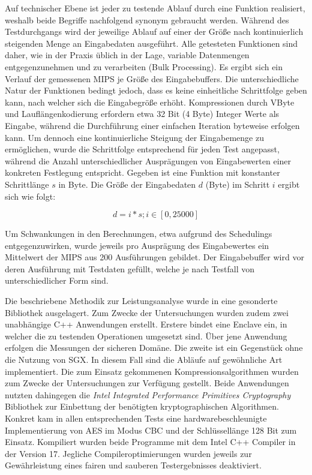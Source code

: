 Auf technischer Ebene ist jeder zu testende Ablauf durch eine Funktion realisiert, weshalb beide Begriffe nachfolgend synonym gebraucht werden. Während des Testdurchgangs wird der jeweilige Ablauf auf einer der Größe nach kontinuierlich steigenden Menge an Eingabedaten ausgeführt. Alle getesteten Funktionen sind daher, wie in der Praxis üblich in der Lage, variable Datenmengen entgegenzunehmen und zu verarbeiten (Bulk Processing). Es ergibt sich ein Verlauf der gemessenen \ac{MIPS} je Größe des Eingabebuffers. Die unterschiedliche Natur der Funktionen bedingt jedoch, dass es keine einheitliche Schrittfolge geben kann, nach welcher sich die Eingabegröße erhöht. Kompressionen durch VByte und Lauflängenkodierung erfordern etwa 32 Bit (4 Byte) Integer Werte als Eingabe, während die Durchführung einer einfachen Iteration byteweise erfolgen kann. Um dennoch eine kontinuierliche Steigung der Eingabemenge zu ermöglichen, wurde die Schrittfolge entsprechend für jeden Test angepasst, während die Anzahl unterschiedlicher Ausprägungen von Eingabewerten einer konkreten Festlegung entspricht. Gegeben ist eine Funktion mit konstanter Schrittlänge $s$ in Byte. Die Größe der Eingabedaten $d$ (Byte) im Schritt $i$ ergibt sich wie folgt: 

\begin{equation*}
	d = i * s; i \in [0, 25000]
\end{equation*}

Um Schwankungen in den Berechnungen, etwa aufgrund des Schedulings entgegenzuwirken, wurde jeweils pro Ausprägung des Eingabewertes ein Mittelwert der \ac{MIPS} aus 200 Ausführungen gebildet. Der Eingabebuffer wird vor deren Ausführung mit Testdaten gefüllt, welche je nach Testfall von unterschiedlicher Form sind.

Die beschriebene Methodik zur Leistungsanalyse wurde in eine gesonderte Bibliothek ausgelagert. Zum Zwecke der Untersuchungen wurden zudem zwei unabhängige C++ Anwendungen erstellt. Erstere bindet eine Enclave ein, in welcher die zu testenden Operationen umgesetzt sind. Über jene Anwendung erfolgen die Messungen der sicheren Domäne. Die zweite ist ein Gegenstück ohne die Nutzung von \ac{SGX}. In diesem Fall sind die Abläufe auf gewöhnliche Art implementiert. Die zum Einsatz gekommenen Kompressionsalgorithmen wurden zum Zwecke der Untersuchungen zur Verfügung gestellt. Beide Anwendungen nutzten dahingegen die \textit{Intel Integrated Performance Primitives Cryptography} Bibliothek zur Einbettung der benötigten kryptographischen Algorithmen. Konkret kam in allen entsprechenden Tests eine hardwarebeschleunigte Implementierung von \ac{AES} im Modus \ac{CBC} und der Schlüssellänge 128 Bit zum Einsatz. Kompiliert wurden beide Programme mit dem Intel C++ Compiler in der Version 17. Jegliche Compileroptimierungen wurden jeweils zur Gewährleistung eines fairen und sauberen Testergebnisses deaktiviert. 


